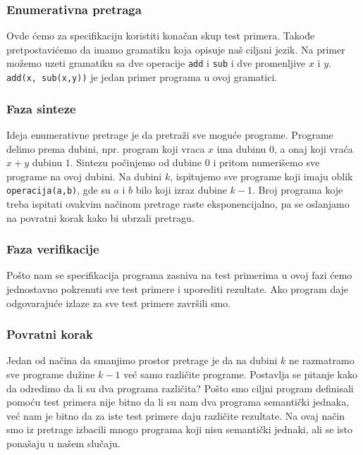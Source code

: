 \subsubsection{Enumerativna pretraga}
\label{subsec:EnumerativnaPretragaCegis}

Ovde ćemo za specifikaciju koristiti konačan skup test primera. Takođe pretpostavićemo da imamo gramatiku koja opisuje naš ciljani jezik. Na primer možemo uzeti gramatiku sa dve operacije \texttt{add} i \texttt{sub} i dve promenljive $x$ i $y$. \texttt{add(x, sub(x,y))} je jedan primer programa u ovoj gramatici.


\subsubsection*{Faza sinteze}


Ideja enumerativne pretrage je da pretraži sve moguće programe. Programe delimo prema dubini, npr. program koji vraca $x$ ima dubinu $0$, a onaj koji vraća $x+y$ dubinu $1$.
Sintezu počinjemo od dubine $0$ i pritom numerišemo sve programe na ovoj dubini. Na dubini $k$, ispitujemo sve programe koji imaju oblik \texttt{operacija(a,b)}, gde su $a$ i $b$ bilo koji izraz dubine $k-1$. Broj programa koje treba ispitati ovakvim načinom pretrage raste eksponencijalno, pa se oslanjamo na povratni korak kako bi ubrzali pretragu.


\subsubsection*{Faza verifikacije}


Pošto nam se specifikacija programa zasniva na test primerima u ovoj fazi ćemo jednostavno pokrenuti sve test primere i uporediti rezultate. Ako program daje odgovarajuće izlaze za sve test primere završili smo.


\subsubsection*{Povratni korak}


Jedan od načina da smanjimo prostor pretrage je da na dubini $k$ ne razmatramo sve programe dužine $k-1$ već samo različite programe. Postavlja se pitanje kako da odredimo da li su dva programa različita? Pošto smo ciljni program definisali pomoću test primera nije bitno da li su nam dva programa semantički jednaka, već nam je bitno da za iste test primere daju različite rezultate. Na ovaj način smo iz pretrage izbacili mnogo programa koji nisu semantički jednaki, ali se isto ponašaju u našem slučaju.
